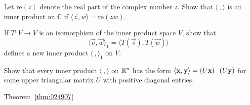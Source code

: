 \documentclass{ximera}
\begin{document}
\begin{problem}\label{prob:inner_prod_9}
Let $\mbox{re}(z)$ denote the real part of the complex number
$z$. Show that $\langle\ , \rangle$ is an inner product on $\mathbb{C}$ if $\langle\vec{z}, \vec{w}\rangle = \mbox{re}(z\overline{w})$.
\end{problem}

\begin{problem}\label{prob:inner_prod_10}
If $T : V \to V$ is an isomorphism of the inner product space $V$, show that
\begin{equation*}
\langle \vec{v}, \vec{w} \rangle_1 = \langle T(\vec{v}), T(\vec{w}) \rangle
\end{equation*}
defines a new inner product $\langle\ , \rangle_{1}$ on $V$.
\end{problem}

\begin{problem}\label{prob:inner_prod_11}
Show that every inner product $\langle\ , \rangle$ on $\mathbb{R}^n$ has the form $\langle\mathbf{x}, \mathbf{y}\rangle = (U\mathbf{x}) \cdot (U\mathbf{y})$ for some upper triangular matrix $U$ with positive diagonal entries. 
\begin{hint}
    Theorem~\ref{thm:024907}
\end{hint}
\end{problem}
\end{document}

